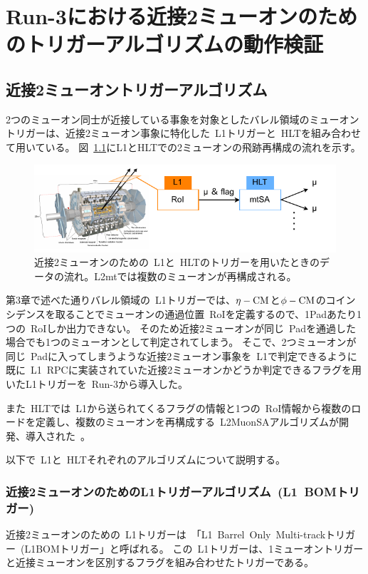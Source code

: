 \chapter{Run-3における近接2ミューオンのためのトリガーアルゴリズムの動作検証}\label{chapter4}

\section{近接2ミューオントリガーアルゴリズム}\label{chapter4-1}
2つのミューオン同士が近接している事象を対象としたバレル領域のミューオントリガーは、近接2ミューオン事象に特化した~L1トリガーと~HLTを組み合わせて用いている。
図~\ref{fig:4-1}にL1とHLTでの2ミューオンの飛跡再構成の流れを示す。

\begin{figure}[H]
    \centering
    \includegraphics[clip, width=13cm]{fig/4/closebyMuonFlow.pdf}
    \caption{近接2ミューオンのための~L1と~HLTのトリガーを用いたときのデータの流れ。L2mtでは複数のミューオンが再構成される。}
    \label{fig:4-1}
\end{figure}

第3章で述べた通りバレル領域の~L1トリガーでは、$\eta-\rm{CM}$と$\phi-\rm{CM}$のコインシデンスを取ることでミューオンの通過位置~RoIを定義するので、1Padあたり1つの~RoIしか出力できない。
そのため近接2ミューオンが同じ~Padを通過した場合でも1つのミューオンとして判定されてしまう。
そこで、2つミューオンが同じ~Padに入ってしまうような近接2ミューオン事象を~L1で判定できるように既に~L1~RPCに実装されていた近接2ミューオンかどうか判定できるフラグを用いたL1トリガーを~Run-3から導入した。

また~HLTでは~L1から送られてくるフラグの情報と1つの~RoI情報から複数のロードを定義し、複数のミューオンを再構成する~L2MuonSAアルゴリズムが開発、導入された~\cite{article:taniguchi}。

以下で~L1と~HLTそれぞれのアルゴリズムについて説明する。


\subsection{近接2ミューオンのためのL1トリガーアルゴリズム~(L1~BOMトリガー)}\label{chapter4-1-1}
近接2ミューオンのための~L1トリガーは~「L1~Barrel~Only~Multi-trackトリガー~(L1BOMトリガー」と呼ばれる。
この~L1トリガーは、1ミューオントリガーと近接ミューオンを区別するフラグを組み合わせたトリガーである。

